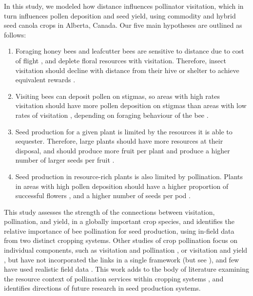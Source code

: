 \documentclass[12pt]{article} %
\begin{document}
In this study, we modeled how distance influences pollinator visitation, which in turn influences pollen deposition and seed yield, using commodity and hybrid seed canola crops in Alberta, Canada.
Our five main hypotheses are outlined as follows:
\begin{enumerate} 
    \item Foraging honey bees and leafcutter bees are sensitive to distance due to cost of flight \citep{schmid1985}, and deplete floral resources with visitation. Therefore, insect visitation should decline with distance from their hive or shelter to achieve equivalent rewards \citep{dukas1998, cresswell2000}. 
    \item Visiting bees can deposit pollen on stigmas, so areas with high rates visitation should have more pollen deposition on stigmas than areas with low rates of visitation \citep{mesquida1988c, hoyle2007}, depending on foraging behaviour of the bee \citep{free1983}.
    \item Seed production for a given plant is limited by the resources it is able to sequester. Therefore, large plants should have more resources at their disposal, and should produce more fruit per plant and produce a higher number of larger seeds per fruit \citep{galen1985, lawrence1993, marini2015}.
    \item Seed production in resource-rich plants is also limited by pollination. Plants in areas with high pollen deposition should have a higher proportion of successful flowers \citep{sabbahi2005}, and a higher number of seeds per pod \citep{morandin2005}.
\end{enumerate}

This study assesses the strength of the connections between visitation, pollination, and yield, in a globally important crop species, and identifies the relative importance of bee pollination for seed production, using in-field data from two distinct cropping systems.
Other studies of crop pollination focus on individual components, such as visitation and pollination \citep{cresswell1999, thomson2001}, or visitation and yield \citep{steffan2003, manning2005, hudewenz2013}, but have not incorporated the links in a single framework (but see \citealp{saez2018}), and few have used realistic field data \citep{morandin2005, isaacs2010}.
This work adds to the body of literature examining the resource context of pollination services \citep{haig1988} within cropping systems \citep{marini2015, tamburini2016, fijen2018, tamburini2019}, and identifies directions of future research in seed production systems.
\end{document}

